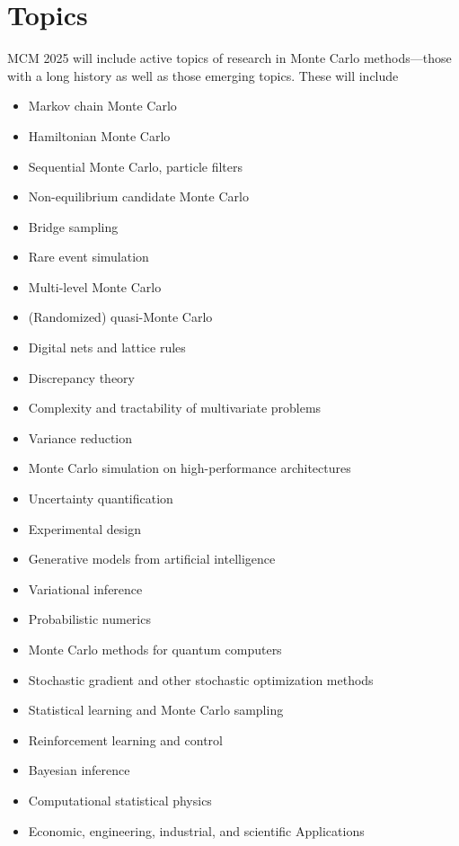 \documentclass{article}
\newcommand{\ny}[1]{{\color{brown}Yiou: #1}}
\begin{document}
\section{Topics}
MCM 2025 will include active topics of research in Monte Carlo methods---those with a long history as well as those emerging topics.  These will include
\begin{itemize}
\item Markov chain Monte Carlo
\item Hamiltonian Monte Carlo
\item Sequential Monte Carlo, particle filters
\item Non-equilibrium candidate Monte Carlo
\item Bridge sampling
\item Rare event simulation
\item Multi-level Monte Carlo
\item (Randomized) quasi-Monte Carlo
\item Digital nets and lattice rules
\item Discrepancy theory
\item Complexity and tractability of multivariate problems
\item Variance reduction
\item Monte Carlo simulation on high-performance architectures
\item Uncertainty quantification
\item Experimental design
\item Generative models from artificial intelligence
\item Variational inference
\item Probabilistic numerics
\item Monte Carlo methods for quantum computers
\item Stochastic gradient and other stochastic optimization methods
\item Statistical learning and Monte Carlo sampling
\item Reinforcement learning and control
\item Bayesian inference
\item Computational statistical physics
\item Economic, engineering, industrial, and scientific Applications
\end{itemize}

\end{document}
